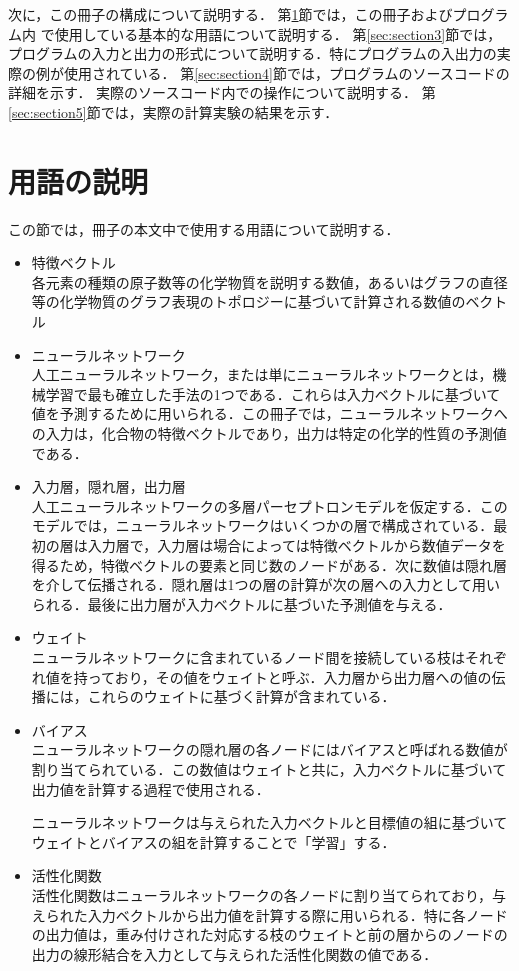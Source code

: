 \documentclass[11pt,titlepage,dvipdfmx,twoside]{jarticle}
\begin{document}
次に，この冊子の構成について説明する．
第\ref{sec:section2}節では，この冊子およびプログラム内
で使用している基本的な用語について説明する．
第\ref{sec:section3}節では，プログラムの入力と出力の形式について説明する．特にプログラムの入出力の実際の例が使用されている．
第\ref{sec:section4}節では，プログラムのソースコードの詳細を示す．
実際のソースコード内での操作について説明する．
第\ref{sec:section5}節では，実際の計算実験の結果を示す．
\newpage

\section{用語の説明}
\label{sec:section2}
この節では，冊子の本文中で使用する用語について説明する．

\begin{itemize}
\item 特徴ベクトル\\
各元素の種類の原子数等の化学物質を説明する数値，あるいはグラフの直径等の化学物質のグラフ表現のトポロジーに基づいて計算される数値のベクトル
\item ニューラルネットワーク \\
人工ニューラルネットワーク，または単にニューラルネットワークとは，機械学習で最も確立した手法の1つである．これらは入力ベクトルに基づいて値を予測するために用いられる．この冊子では，ニューラルネットワークへの入力は，化合物の特徴ベクトルであり，出力は特定の化学的性質の予測値である．
\item 入力層，隠れ層，出力層\\
人工ニューラルネットワークの多層パーセプトロンモデルを仮定する．このモデルでは，ニューラルネットワークはいくつかの層で構成されている．最初の層は入力層で，入力層は場合によっては特徴ベクトルから数値データを得るため，特徴ベクトルの要素と同じ数のノードがある．次に数値は隠れ層を介して伝播される．隠れ層は1つの層の計算が次の層への入力として用いられる．最後に出力層が入力ベクトルに基づいた予測値を与える．
\item ウェイト\\
ニューラルネットワークに含まれているノード間を接続している枝はそれぞれ値を持っており，その値をウェイトと呼ぶ．入力層から出力層への値の伝播には，これらのウェイトに基づく計算が含まれている．

\item バイアス\\
ニューラルネットワークの隠れ層の各ノードにはバイアスと呼ばれる数値が割り当てられている．この数値はウェイトと共に，入力ベクトルに基づいて出力値を計算する過程で使用される．
\medskip

ニューラルネットワークは与えられた入力ベクトルと目標値の組に基づいてウェイトとバイアスの組を計算することで「学習」する．

\item 活性化関数\\
活性化関数はニューラルネットワークの各ノードに割り当てられており，与えられた入力ベクトルから出力値を計算する際に用いられる．特に各ノードの出力値は，重み付けされた対応する枝のウェイトと前の層からのノードの出力の線形結合を入力として与えられた活性化関数の値である．

\end{itemize}
\end{document}
